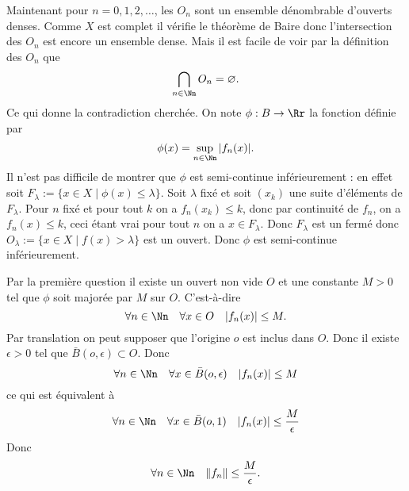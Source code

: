 {{Maintenant pour $n = 0,1,2,\ldots$, les $O_n$ sont un ensemble dénombrable d'ouverts denses. Comme $X$ est complet il vérifie le théorème de Baire donc l'intersection des $O_n$ est encore un ensemble dense. Mais il est facile de voir par la définition des $O_n$ que
$$\bigcap_{n\in\Nn}O_n = \varnothing.$$
Ce qui donne la contradiction cherchée.
On note $\phi : B \to \Rr$ la fonction définie par 
$$\phi(x) = \sup_{n\in\Nn} |f_n(x)|.$$
Il n'est pas difficile de montrer que $\phi$ est semi-continue inf\'erieurement :
en effet soit $F_\lambda := \{ x\in X \mid \phi(x) \le \lambda \}$.
Soit $\lambda$  fixé et soit $(x_k)$ une suite d'éléments de $F_\lambda$.
Pour $n$ fixé et pour tout $k$ on a $f_n(x_k) \le k$, donc par continuité de $f_n$,
on a $f_n(x) \le k$, ceci étant vrai pour tout $n$ on a $x\in F_\lambda$.
Donc $F_\lambda$ est un fermé donc $O_\lambda := \{ x\in X \mid f(x) > \lambda \}$ est un ouvert.
Donc $\phi$ est semi-continue inf\'erieurement.

Par la première question il existe un ouvert non vide $O$ et une constante $M>0$ tel que
$\phi$ soit majorée par $M$ sur $O$.
C'est-à-dire
$$\forall n\in \Nn \quad \forall x \in O \quad |f_n(x)| \le M.$$
Par translation on peut supposer que l'origine $o$ est inclus dans $O$. Donc il existe $\epsilon >0$ tel que $\bar B(o,\epsilon) \subset O$. Donc
$$\forall n\in \Nn \quad \forall x \in \bar B(o,\epsilon) \quad |f_n(x)| \le M$$
ce qui est équivalent à 
$$\forall n\in \Nn \quad \forall x \in \bar B(o,1) \quad |f_n(x)| \le \frac M \epsilon$$
Donc $$\forall n\in \Nn \quad  \|f_n\| \le \frac M \epsilon.$$
}
}
